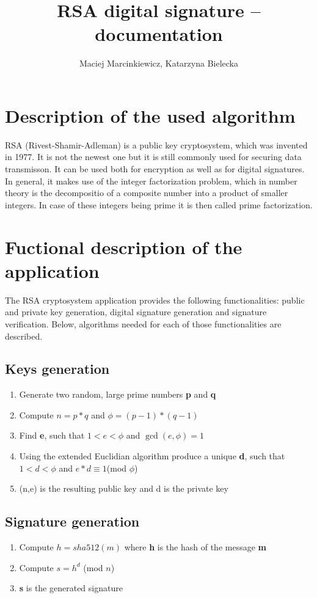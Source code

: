 \documentclass{article}
\title{ RSA digital signature -- documentation}
\author{Maciej Marcinkiewicz, Katarzyna Bielecka}
\begin{document}
\maketitle

\newpage
\section{Description of the used algorithm}
RSA (Rivest-Shamir-Adleman) is a public key cryptosystem, which was invented in 1977. It is not the newest one but it is still commonly used for securing data transmisson.
It can be used both for encryption as well as for digital signatures. In general, it makes use of the integer factorization problem, which in number theory is the decompositio of a composite number into a product of smaller integers. In case of these integers being prime it is then called prime factorization.  

\section{Fuctional description of the application}
The RSA cryptosystem application provides the following functionalities:
public and private key generation, digital signature generation and signature verification.
Below, algorithms needed for each of those functionalities are described.

\subsection{Keys generation}
\begin{enumerate}
    \item Generate two random, large prime numbers \textbf{p} and \textbf{q}
    \item Compute $ n = p*q $  and $ \phi = (p - 1)*(q - 1) $
    \item Find \textbf{e}, such that  $ 1 < e < \phi$ and $\gcd(e,\phi) = 1 $
    \item Using the extended Euclidian algorithm produce a unique \textbf{d}, such that $ 1 < d < \phi $  and $ e*d \equiv  1 $(mod $\phi$)  
    \item (n,e) is the resulting public key and d is the private key
\end{enumerate}

\subsection{Signature generation}
\begin{enumerate}
    \item Compute $  h = sha512(m) $ where \textbf{h} is the hash of the message \textbf{m}  
    \item Compute $ s = h^d $ (mod $n$)
    \item \textbf{s} is the generated signature
\end{enumerate}
\end{document}
